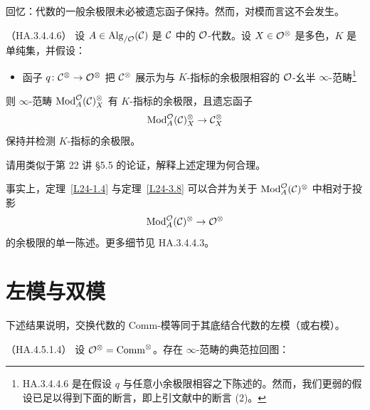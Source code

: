 
\nitem\label{L24-3.7} 回忆：代数的一般余极限未必被遗忘函子保持。然而，对模而言这不会发生。

\begin{theorem}\label{L24-3.8}（HA.3.4.4.6）
设 $A\in\operatorname{Alg}_{/\mathcal{O}}(\mathcal{C})$ 是 $\mathcal{C}$ 中的 $\mathcal{O}$-代数。设 $X\in\mathcal{O}^{\otimes}$ 是多色，$K$ 是单纯集，并假设：
\begin{itemize}[leftmargin=2.2em,itemsep=0.1em]
\item 函子 $q\colon\mathcal{C}^{\otimes}\to\mathcal{O}^{\otimes}$ 把 $\mathcal{C}^{\otimes}$ 展示为与 $K$-指标的余极限相容的 $\mathcal{O}$-幺半 $\infty$-范畴\footnote{HA.3.4.4.6 是在假设 $q$ 与任意小余极限相容之下陈述的。然而，我们更弱的假设已足以得到下面的断言，即上引文献中的断言 (2)。}
\end{itemize}
则 $\infty$-范畴 $\operatorname{Mod}^{\mathcal{O}}_{A}(\mathcal{C})^{\otimes}_{X}$ 有 $K$-指标的余极限，且遗忘函子
\[
\operatorname{Mod}^{\mathcal{O}}_{A}(\mathcal{C})^{\otimes}_{X}\to\mathcal{C}^{\otimes}_{X}
\]
保持并检测 $K$-指标的余极限。
\end{theorem}

\begin{remark}\label{L24-3.9}
请用类似于第 22 讲 §5.5 的论证，解释上述定理为何合理。
\end{remark}

\begin{remark}\label{L24-3.10}
事实上，定理~\ref{L24-1.4} 与定理~\ref{L24-3.8} 可以合并为关于 $\operatorname{Mod}^{\mathcal{O}}_{A}(\mathcal{C})^{\otimes}$ 中相对于投影
\[
\operatorname{Mod}^{\mathcal{O}}_{A}(\mathcal{C})^{\otimes}\to\mathcal{O}^{\otimes}
\]
的余极限的单一陈述。更多细节见 HA.3.4.4.3。
\end{remark}

\section{左模与双模}

\nitem\label{L24-4.1} 下述结果说明，交换代数的 $\mathrm{Comm}$-模等同于其底结合代数的左模（或右模）。

\begin{proposition}\label{L24-4.2}（HA.4.5.1.4）
设 $\mathcal{O}^{\otimes}=\mathrm{Comm}^{\otimes}$。存在 $\infty$-范畴的典范拉回图：
\begin{center}
\end{center}
\end{proposition}

